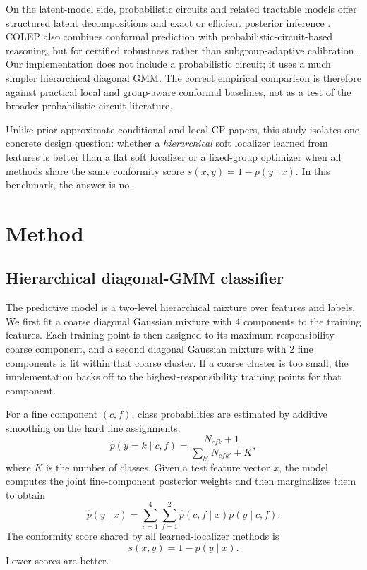 \documentclass{article}
\begin{document}
On the latent-model side, probabilistic circuits and related tractable models offer structured latent decompositions and exact or efficient posterior inference \citep{poon2011sumproduct,ventola2023pcsknow}. COLEP also combines conformal prediction with probabilistic-circuit-based reasoning, but for certified robustness rather than subgroup-adaptive calibration \citep{kang2024colep}. Our implementation does not include a probabilistic circuit; it uses a much simpler hierarchical diagonal GMM. The correct empirical comparison is therefore against practical local and group-aware conformal baselines, not as a test of the broader probabilistic-circuit literature.

Unlike prior approximate-conditional and local CP papers, this study isolates one concrete design question: whether a \emph{hierarchical} soft localizer learned from features is better than a flat soft localizer or a fixed-group optimizer when all methods share the same conformity score $s(x,y)=1-p(y \mid x)$. In this benchmark, the answer is no.

\section{Method}
\label{sec:method}
\subsection{Hierarchical diagonal-GMM classifier}
The predictive model is a two-level hierarchical mixture over features and labels. We first fit a coarse diagonal Gaussian mixture with 4 components to the training features. Each training point is then assigned to its maximum-responsibility coarse component, and a second diagonal Gaussian mixture with 2 fine components is fit within that coarse cluster. If a coarse cluster is too small, the implementation backs off to the highest-responsibility training points for that component.

For a fine component $(c,f)$, class probabilities are estimated by additive smoothing on the hard fine assignments:
\begin{equation}
  \hat{p}(y=k \mid c,f)
  =
  \frac{N_{cfk} + 1}{\sum_{k'} N_{cfk'} + K},
\end{equation}
where $K$ is the number of classes. Given a test feature vector $x$, the model computes the joint fine-component posterior weights and then marginalizes them to obtain
\begin{equation}
  \hat{p}(y \mid x)
  =
  \sum_{c=1}^{4}\sum_{f=1}^{2}
  \hat{p}(c,f \mid x)\hat{p}(y \mid c,f).
\end{equation}
The conformity score shared by all learned-localizer methods is
\begin{equation}
  s(x,y) = 1 - \hat{p}(y \mid x).
\end{equation}
Lower scores are better.
\end{document}
